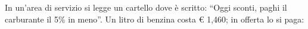 In un'area di servizio si legge un cartello dove è scritto: 
``Oggi sconti, paghi il carburante il 5\% in meno''. 
Un litro di benzina costa \euro{} 1,460; in offerta lo si paga:
